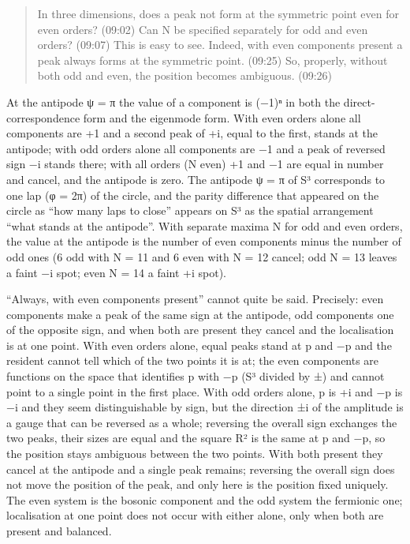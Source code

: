 \documentclass[
  a4paper,
]{article}
\begin{document}
\begin{quote}
In three dimensions, does a peak not form at the symmetric point even
for even orders? (09:02) Can N be specified separately for odd and even
orders? (09:07) This is easy to see. Indeed, with even components
present a peak always forms at the symmetric point. (09:25) So,
properly, without both odd and even, the position becomes ambiguous.
(09:26)
\end{quote}

At the antipode ψ = π the value of a component is (−1)ⁿ in both the
direct-correspondence form and the eigenmode form. With even orders
alone all components are +1 and a second peak of +i, equal to the first,
stands at the antipode; with odd orders alone all components are −1 and
a peak of reversed sign −i stands there; with all orders (N even) +1 and
−1 are equal in number and cancel, and the antipode is zero. The
antipode ψ = π of S³ corresponds to one lap (φ = 2π) of the circle, and
the parity difference that appeared on the circle as ``how many laps to
close'' appears on S³ as the spatial arrangement ``what stands at the
antipode''. With separate maxima N for odd and even orders, the value at
the antipode is the number of even components minus the number of odd
ones (6 odd with N = 11 and 6 even with N = 12 cancel; odd N = 13 leaves
a faint −i spot; even N = 14 a faint +i spot).

``Always, with even components present'' cannot quite be said.
Precisely: even components make a peak of the same sign at the antipode,
odd components one of the opposite sign, and when both are present they
cancel and the localisation is at one point. With even orders alone,
equal peaks stand at p and −p and the resident cannot tell which of the
two points it is at; the even components are functions on the space that
identifies p with −p (S³ divided by ±) and cannot point to a single
point in the first place. With odd orders alone, p is +i and −p is −i
and they seem distinguishable by sign, but the direction ±i of the
amplitude is a gauge that can be reversed as a whole; reversing the
overall sign exchanges the two peaks, their sizes are equal and the
square R² is the same at p and −p, so the position stays ambiguous
between the two points. With both present they cancel at the antipode
and a single peak remains; reversing the overall sign does not move the
position of the peak, and only here is the position fixed uniquely. The
even system is the bosonic component and the odd system the fermionic
one; localisation at one point does not occur with either alone, only
when both are present and balanced.
\end{document}
